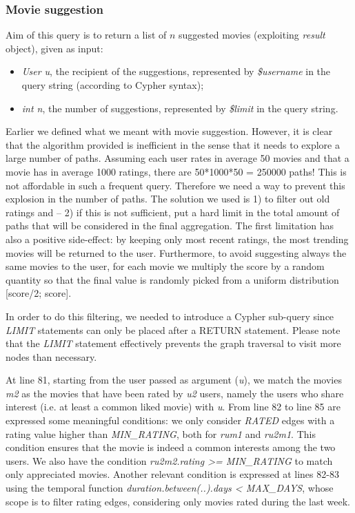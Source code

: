 \documentclass[11pt]{article}
\begin{document}
\subsubsection{Movie suggestion}
Aim of this query is to return a list of $n$ suggested movies (exploiting \emph{result} object), given as input:
\begin{itemize}
    \item \emph{User u}, the recipient of the suggestions, represented by \emph{\$username} in the query string (according to Cypher syntax);
    \item \emph{int n}, the number of suggestions, represented by \emph{\$limit} in the query string.
\end{itemize}

Earlier we defined what we meant with movie suggestion. However, it is clear that the algorithm provided is inefficient in the sense that it needs to explore a large number of paths. Assuming each user rates in average 50 movies and that a movie has in average 1000 ratings, there are 50*1000*50 = 250000 paths! This is not affordable in such a frequent query. Therefore we need a way to prevent this explosion in the number of paths. The solution we used is 1) to filter out old ratings and -- 2) if this is not sufficient, put a hard limit in the total amount of paths that will be considered in the final aggregation. The first limitation has also a positive side-effect: by keeping only most recent ratings, the most trending movies will be returned to the user. Furthermore, to avoid suggesting always the same movies to the user, for each movie we multiply the score by a random quantity so that the final value is randomly picked from a uniform distribution [score/2; score].

In order to do this filtering, we needed to introduce a Cypher sub-query since \emph{LIMIT} statements can only be placed after a RETURN statement. Please note that the \emph{LIMIT} statement effectively prevents the graph traversal to visit more nodes than necessary.



At line 81, starting from the user passed as argument (\emph{u}), we match the movies \emph{m2} as the movies that have been rated by \emph{u2} users, namely the users who share interest (i.e. at least a common liked movie) with \emph{u}. 
From line 82 to line 85 are expressed some meaningful conditions: we only consider \emph{RATED} edges with a rating value higher than \emph{MIN\_RATING}, both for \emph{rum1} and \emph{ru2m1}. This condition ensures that the movie is indeed a common interests among the two users. We also have the condition \emph{ru2m2.rating >= MIN\_RATING} to match only appreciated movies. Another relevant condition is expressed at lines 82-83 using the temporal function \emph{duration.between(..).days < MAX\_DAYS}, whose scope is to filter rating edges, considering only movies rated during the last week.
\end{document}
